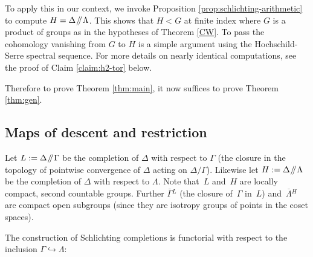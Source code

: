 \documentclass[JEP,XML,SOM,Unicode,published]{cedram}
\newcommand{\oGL}{\ensuremath{\overline{\Gamma}{}^L}}
\newcommand{\oLH}{\ensuremath{\overline{\Lambda}{}^H}}
\newcommand{\sslash}{\mathbin{\mkern-3mu /\mkern-5mu/ \mkern-3mu}}
\theoremstyle{definition}
\begin{document}
To apply this in our context, we invoke Proposition \ref{prop:schlichting-arithmetic} to compute
$H=\Delta \sslash \Lambda$. This shows that $H<G$ at finite index where $G$ is a product of groups
as in the hypotheses of Theorem \ref{CW}. To pass the cohomology vanishing from $G$ to $H$ is a simple argument using the Hochschild-Serre spectral sequence. For more details on nearly identical computations, see the proof of Claim \ref{claim:h2-tor} below.

Therefore to prove Theorem \ref{thm:main}, it now suffices to prove Theorem \ref{thm:gen}.

\subsection{Maps of descent and restriction} \label{sec:restrict}
Let $L:=\Delta \sslash \Gamma$ be the completion of $\Delta$ with respect to $\Gamma$ (\ie the closure in the topology of pointwise convergence of $\Delta$ acting on $\Delta / \Gamma$). Likewise let $H:=\Delta\sslash\Lambda$ be the completion of $\Delta$ with respect to $\Lambda$. Note that~$L$ and~$H$ are locally compact, second countable groups. Further $\oGL$ (the closure of~$\Gamma$ in~$L$) and~$\oLH$ are compact open subgroups (since they are isotropy groups of points in the coset spaces).

The construction of Schlichting completions is functorial with respect to the inclusion $\Gamma\hookrightarrow \Lambda$:
\end{document}
